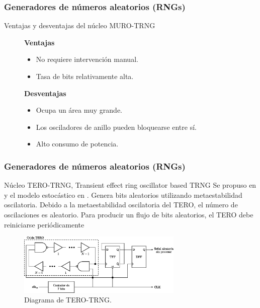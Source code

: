 \documentclass[10pt]{beamer}
\begin{document}
\begin{frame}
    \frametitle{Generadores de números aleatorios (RNGs)}
    \begin{block}{Ventajas y desventajas del núcleo MURO-TRNG}
        \justifying
          \begin{figure}[!h]
				\begin{minipage}[t]{0.48\textwidth}
					\textbf{Ventajas}
					\begin{itemize}
						\justifying
						\item No requiere intervención manual.
						\item Tasa de bits relativamente alta.
					\end{itemize}
				\end{minipage} \hfill \begin{minipage}[t]{0.48\textwidth}
					\textbf{Desventajas}
					\begin{itemize}
						\justifying
						\item Ocupa un área muy grande.
						\item Los osciladores de anillo pueden bloquearse entre sí.
						\item Alto consumo de potencia.
					\end{itemize}
				\end{minipage}
			\end{figure}		
	\end{block}
\end{frame}


\begin{frame}
    \frametitle{Generadores de números aleatorios (RNGs)}
    \begin{block}{Núcleo TERO-TRNG, Transient effect ring oscillator based TRNG}
        \justifying
         Se propuso en \cite{Varchola2010} y el modelo estocástico en \cite{Haddad2015}. Genera bits aleatorios utilizando metaestabilidad oscilatoria. Debido a la metaestabilidad oscilatoria del TERO, el número de oscilaciones es aleatorio. Para producir un flujo de bits aleatorios, el TERO debe reiniciarse periódicamente
	\end{block}
	\begin{figure}[hbtp]
	    \centering
	    \includegraphics[width=0.7\textwidth]{A4_TERO_TRNG}
	    \caption{Diagrama de TERO-TRNG.}
        \label{fig:A4_TERO_TRNG}
    \end{figure}
\end{frame}
\end{document}
